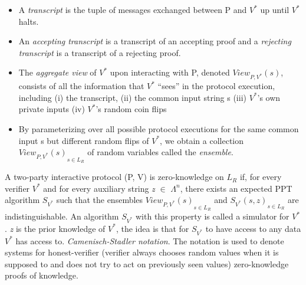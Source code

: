 \documentclass[a4paper]{article}
\newcommand{\quotes}[1]{``#1''}
\begin{document}
\begin{itemize}
  \item A \emph{transcript} is the tuple of messages exchanged between P and ${V^{*}}$ up until ${V^{*}}$ halts. 
  \item An \emph{accepting transcript} is a transcript of an accepting proof and a \emph{rejecting transcript} is a transcript of a rejecting proof.
  \item The \emph{aggregate view} of ${V^{*}}$ upon interacting with P, denoted $View_{P,V^{*}}(s)$, consists of all the information that ${V^{*}}$ \quotes{sees} in the protocol execution, including (i) the transcript, (ii) the common input string s (iii) ${V^{*}}$’s own private inputs (iv) ${V^{*}}$’s random coin flips  
  \item By parameterizing over all possible protocol executions for the same common input s but different random flips of ${V^{*}}$, we obtain a collection ${ View_{P,V^{*}}(s)}_{s \in L_R }$ of random variables called the \emph{ensemble}.
\end{itemize}
A two-party interactive protocol (P, V) is zero-knowledge on \textit{$L_R$} if, for every verifier ${V^{*}}$ and for every auxiliary string \textit{z} $\in$ \(\Lambda^n\), there exists an expected PPT algorithm $S_{V^{*}}$ such that the ensembles ${ View_{P,V^{*}}(s)}_{s \in L_R }$ and ${S_{V^{*}}(s,z)}_{s \in L_R }$ are indistinguishable. An algorithm $S_{V^{*}}$ with this property is called a simulator for ${V^{*}}$. \textit{z} is the prior knowledge of ${V^{*}}$, the idea is that for $S_{V^{*}}$ to have access to any data ${V^{*}}$ has access to. 
\newline
\textit{ Camenisch-Stadler notation}. The notation is used to denote systems for honest-verifier (verifier always chooses random values when it is supposed to and does not try to act on previously seen values) zero-knowledge proofs of knowledge.
\end{document}
